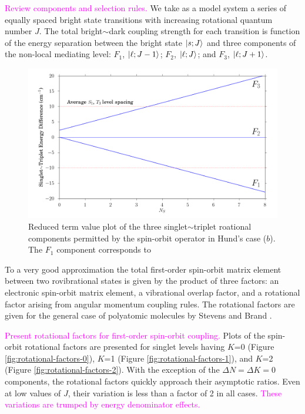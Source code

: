 \documentclass[12pt,draft]{mitthesis}
\newcommand{\POINT}[1]{\textcolor{magenta}{#1}}
\begin{document}
\POINT{Review components and selection rules.}  We take as a model
system a series of equally spaced bright state transitions with
increasing rotational quantum number $J$.  The total bright$\sim$dark
coupling strength for each transition is function of the energy
separation between the bright state $\mathinner{|{s;J}\rangle}$ and three components
of the non-local mediating level: $F_1$, $\mathinner{|{\ell;J-1}\rangle}$; $F_2$,
$\mathinner{|{\ell;J}\rangle}$; and $F_3$, $\mathinner{|{\ell;J+1}\rangle}$.

\begin{figure}
  \caption{ Reduced term value plot of the three singlet$\sim$triplet
    roational components permitted by the spin-orbit operator in
    Hund's case ($b$).  The $F_1$ component corresponds to  }
  \label{fig:components}
  \centering
  \includegraphics[width=6in]{f-components.png}
\end{figure}

To a very good approximation the total first-order spin-orbit matrix
element between two rovibrational states is given by the product of
three factors: an electronic spin-orbit matrix element, a vibrational
overlap factor, and a rotational factor arising from angular momentum
coupling rules.  The rotational factors are given for the general case
of polyatomic molecules by Stevens and Brand \cite{stevens73}.  

\POINT{Present rotational factors for first-order spin-orbit
  coupling.}  Plots of the spin-orbit rotational factors are presented
for singlet levels having $K$=0 (Figure
\ref{fig:rotational-factors-0}), $K$=1 (Figure
\ref{fig:rotational-factors-1}), and $K$=2 (Figure
\ref{fig:rotational-factors-2}).  With the exception of the $\Delta N
= \Delta K = 0$ components, the rotational factors quickly approach
their asymptotic ratios.  Even at low values of $J$, their variation
is less than a factor of 2 in all cases.  \POINT{These variations are
  trumped by energy denominator effects.}
\end{document}
